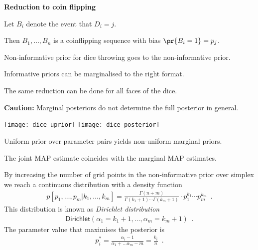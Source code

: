 \documentclass[landscape,footrule]{foils}
\begin{document}
\textbf{Reduction to coin flipping} 
\begin{triangles}
\item Let $B_i$ denote the event that $D_i=j$.
\item Then $B_1,\ldots, B_n$ is a coinflipping sequence with bias $\pr{B_i=1}=p_j$.
\item Non-informative prior for dice throwing goes to the non-informative prior.
\item Informative priors can be marginalised to the right format.
\item The same reduction can be done for all faces of the dice.    
\end{triangles} 
\vspace*{1cm}

\textbf{Caution:} Marginal posteriors do not determine the full posterior in general.


\centerline{
\texttt{[image: dice\_uprior]}\hspace*{1cm}
\texttt{[image: dice\_posterior]}}

\begin{triangles}
\item Uniform prior over parameter pairs yields non-uniform marginal priors.
\item The joint MAP estimate coincides with the marginal MAP estimates.  
\end{triangles}



By increasing the number of grid points in the non-informative prior over simplex we reach a continuous distribution with a density function
\begin{align*}  
p[p_1,\ldots, p_m|k_1,\ldots, k_m] = \frac{\Gamma(n+m)}{\Gamma(k_1+1)\cdots\Gamma(k_m+1)}\cdot p_1^{k_1}\cdots p_m^{k_m}\enspace.
\end{align*}
This distribution is known as \emph{Dirichlet  distribution}
\begin{align*}
 \mathsf{Dirichlet}(\alpha_1=k_1+1,\ldots, \alpha_m=k_m+1)\enspace.
\end{align*} 
The parameter value that maximises the posterior is 
\begin{align*}
p_i^* =\frac{\alpha_i-1}{\alpha_1+\ldots\alpha_m-m}=\frac{k_i}{n}\enspace.
\end{align*} 


\end{document}
